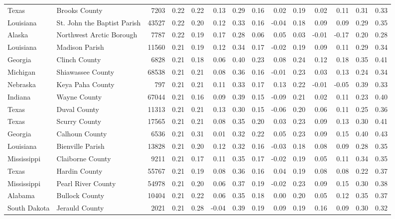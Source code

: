 \documentclass[10pt, letterpaper]{article}
\begin{document}
\begin{spacing}{1.4}
\begin{table}
{\begin{tabular}{llrrrrrrrrrrrr}
Texas & Brooks County & 7203 & 0.22 & 0.22 & 0.13 & 0.29 & 0.16 & 0.02 & 0.19 & 0.02 & 0.11 & 0.31 & 0.33 \\
Louisiana & St. John the Baptist Parish & 43527 & 0.22 & 0.20 & 0.12 & 0.33 & 0.16 & -0.04 & 0.18 & 0.09 & 0.09 & 0.29 & 0.35 \\
Alaska & Northwest Arctic Borough & 7787 & 0.22 & 0.19 & 0.17 & 0.28 & 0.06 & 0.05 & 0.03 & -0.01 & -0.17 & 0.20 & 0.28 \\
Louisiana & Madison Parish & 11560 & 0.21 & 0.19 & 0.12 & 0.34 & 0.17 & -0.02 & 0.19 & 0.09 & 0.11 & 0.29 & 0.34 \\
Georgia & Clinch County & 6828 & 0.21 & 0.18 & 0.06 & 0.40 & 0.23 & 0.08 & 0.24 & 0.12 & 0.18 & 0.35 & 0.41 \\
Michigan & Shiawassee County & 68538 & 0.21 & 0.21 & 0.08 & 0.36 & 0.16 & -0.01 & 0.23 & 0.03 & 0.13 & 0.24 & 0.34 \\
Nebraska & Keya Paha County & 797 & 0.21 & 0.21 & 0.11 & 0.33 & 0.17 & 0.13 & 0.22 & -0.01 & -0.05 & 0.39 & 0.33 \\
Indiana & Wayne County & 67044 & 0.21 & 0.16 & 0.09 & 0.39 & 0.15 & -0.09 & 0.21 & 0.02 & 0.11 & 0.23 & 0.40 \\
Texas & Duval County & 11313 & 0.21 & 0.21 & 0.13 & 0.30 & 0.15 & -0.06 & 0.20 & 0.06 & 0.11 & 0.25 & 0.36 \\
Texas & Scurry County & 17565 & 0.21 & 0.21 & 0.08 & 0.35 & 0.20 & 0.03 & 0.23 & 0.09 & 0.13 & 0.30 & 0.41 \\
Georgia & Calhoun County & 6536 & 0.21 & 0.31 & 0.01 & 0.32 & 0.22 & 0.05 & 0.23 & 0.09 & 0.15 & 0.40 & 0.43 \\
Louisiana & Bienville Parish & 13828 & 0.21 & 0.20 & 0.12 & 0.32 & 0.16 & -0.03 & 0.18 & 0.08 & 0.09 & 0.28 & 0.35 \\
Mississippi & Claiborne County & 9211 & 0.21 & 0.17 & 0.11 & 0.35 & 0.17 & -0.02 & 0.19 & 0.05 & 0.11 & 0.34 & 0.35 \\
Texas & Hardin County & 55767 & 0.21 & 0.19 & 0.08 & 0.36 & 0.16 & 0.04 & 0.19 & 0.08 & 0.08 & 0.22 & 0.37 \\
Mississippi & Pearl River County & 54978 & 0.21 & 0.20 & 0.06 & 0.37 & 0.19 & -0.02 & 0.23 & 0.09 & 0.15 & 0.30 & 0.38 \\
Alabama & Bullock County & 10404 & 0.21 & 0.22 & 0.06 & 0.35 & 0.18 & 0.00 & 0.20 & 0.05 & 0.12 & 0.35 & 0.37 \\
South Dakota & Jerauld County & 2021 & 0.21 & 0.28 & -0.04 & 0.39 & 0.19 & 0.09 & 0.19 & 0.16 & 0.09 & 0.30 & 0.32 \\

\end{tabular}}
\end{table}
\end{spacing}
\end{document}
